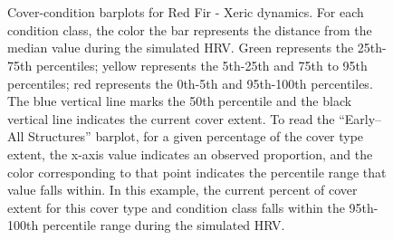 \begin{figure}[!htbp]
  \\%
  \\%
    \\%
    \\%
    \\%
    \\%
    \\%
  \caption{Cover-condition barplots for Red Fir - Xeric dynamics. For each condition class, the color the bar represents the distance from the median value during the simulated HRV. Green represents the 25th-75th percentiles; yellow represents the 5th-25th and 75th to 95th percentiles; red represents the 0th-5th and 95th-100th percentiles. The blue vertical line marks the 50th percentile and the black vertical line indicates the current cover extent. To read the ``Early–All Structures'' barplot, for a given percentage of the cover type extent, the x-axis value indicates an observed proportion, and the color corresponding to that point indicates the percentile range that value falls within. In this example, the current percent of cover extent for this cover type and condition class falls within the 95th-100th percentile range during the simulated HRV.}
  \label{fig:covcondbar_rfrx}
\end{figure}

